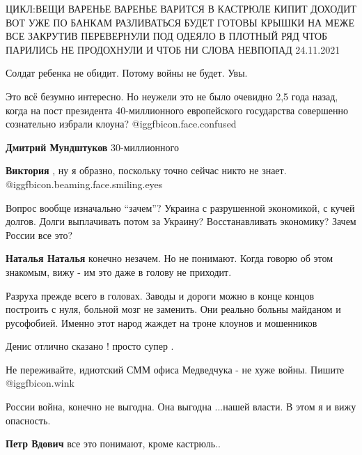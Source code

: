 \begin{itemize}

\obeycr
ЦИКЛ:ВЕЩИ
ВАРЕНЬЕ
ВАРЕНЬЕ ВАРИТСЯ В КАСТРЮЛЕ
КИПИТ ДОХОДИТ ВОТ УЖЕ
ПО БАНКАМ РАЗЛИВАТЬСЯ БУДЕТ
ГОТОВЫ КРЫШКИ НА МЕЖЕ
ВСЕ ЗАКРУТИВ ПЕРЕВЕРНУЛИ
ПОД ОДЕЯЛО В ПЛОТНЫЙ РЯД
ЧТОБ ПАРИЛИСЬ НЕ ПРОДОХНУЛИ
И ЧТОБ НИ СЛОВА НЕВПОПАД
24.11.2021
\restorecr

Солдат ребенка не обидит. Потому войны не будет. Увы.


Это всё безумно интересно. Но неужели это не было очевидно 2,5 года назад,
когда на пост президента 40-миллионного европейского государства совершенно
сознательно избрали клоуна?  @igg{fbicon.face.confused} 

\begin{itemize} %
\textbf{Дмитрий Мундштуков} 30-миллионного

\textbf{Виктория} , ну я образно, поскольку точно сейчас никто не знает.  @igg{fbicon.beaming.face.smiling.eyes} 
\end{itemize} %


Вопрос вообще изначально \enquote{зачем}? Украина с разрушенной экономикой, с кучей
долгов. Долги выплачивать потом за Украину? Восстанавливать экономику? Зачем
России все это?

\begin{itemize} %
\textbf{Наталья Наталья} конечно незачем. Но не понимают. Когда говорю об этом знакомым, вижу - им это даже в голову не приходит.


Разруха прежде всего в головах. Заводы и дороги можно в конце концов построить
с нуля, больной мозг не заменить. Они реально больны майданом и русофобией.
Именно этот народ жаждет на троне клоунов и мошенников

\end{itemize} %

Денис отлично сказано ! просто супер .

Не переживайте, идиотский СММ офиса Медведчука - не хуже войны. Пишите  @igg{fbicon.wink} 


России война, конечно не выгодна. Она выгодна ...нашей власти.
В этом я и вижу опасность.

\begin{itemize} %
\textbf{Петр Вдович} все это понимают, кроме кастрюль..


\end{itemize}
\end{itemize}
